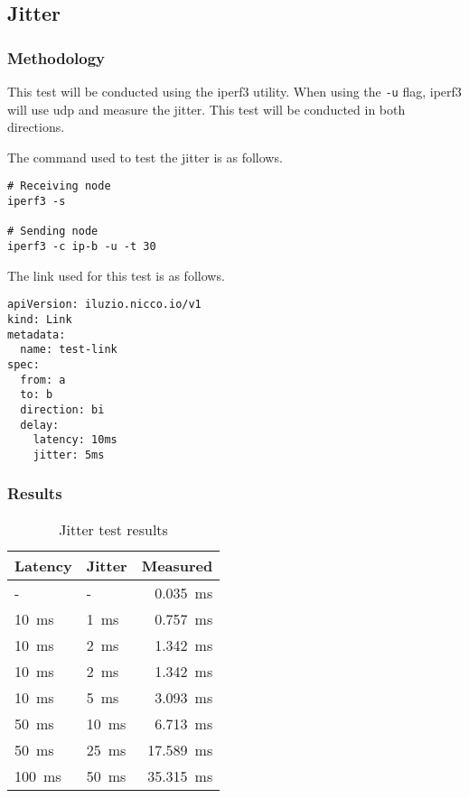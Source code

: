 \subsection{Jitter}

\subsubsection{Methodology}

This test will be conducted using the iperf3 utility.
When using the \verb|-u| flag, iperf3 will use \ac{udp} and measure the jitter.
This test will be conducted in both directions.

The command used to test the jitter is as follows.

\begin{verbatim}
# Receiving node
iperf3 -s

# Sending node
iperf3 -c ip-b -u -t 30
\end{verbatim}

The link used for this test is as follows.

\begin{verbatim}
apiVersion: iluzio.nicco.io/v1
kind: Link
metadata:
  name: test-link
spec:
  from: a
  to: b
  direction: bi
  delay:
    latency: 10ms
    jitter: 5ms
\end{verbatim}

\subsubsection{Results}

\begin{table}[h]
  \centering
  \begin{tabular}{|l|l|r|}
    \hline
    Latency                 & Jitter                 & Measured                   \\
    \hline\hline
    -                       & -                      & \SI{0.035}{\milli\second}  \\ \hline
    \SI{10}{\milli\second}  & \SI{1}{\milli\second}  & \SI{0.757}{\milli\second}  \\ \hline
    \SI{10}{\milli\second}  & \SI{2}{\milli\second}  & \SI{1.342}{\milli\second}  \\ \hline
    \SI{10}{\milli\second}  & \SI{2}{\milli\second}  & \SI{1.342}{\milli\second}  \\ \hline
    \SI{10}{\milli\second}  & \SI{5}{\milli\second}  & \SI{3.093}{\milli\second}  \\ \hline
    \SI{50}{\milli\second}  & \SI{10}{\milli\second} & \SI{6.713}{\milli\second}  \\ \hline
    \SI{50}{\milli\second}  & \SI{25}{\milli\second} & \SI{17.589}{\milli\second} \\ \hline
    \SI{100}{\milli\second} & \SI{50}{\milli\second} & \SI{35.315}{\milli\second} \\ \hline
  \end{tabular}
  \caption{Jitter test results}
  \label{table:evaluation-jitter}
\end{table}

